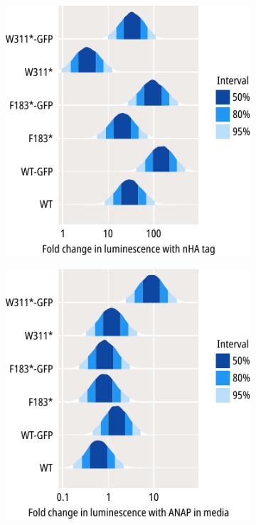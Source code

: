 \begin{figure}[hbtp]
\begin{subfigure}[t]{0.45\textwidth}
	\end{subfigure}
	\vfill
	\begin{subfigure}[t]{0.45\textwidth}
		\caption{}\label{ch3fig:surface_expression_3}
		\centering
		\includegraphics[width=\textwidth]{surface_expression_3.pdf}
	\end{subfigure}
	\hfill
	\begin{subfigure}[t]{0.45\textwidth}
		\caption{}\label{ch3fig:surface_expression_4}
		\centering
		\includegraphics[width=\textwidth]{surface_expression_4.pdf}

\end{subfigure}
\end{figure}
